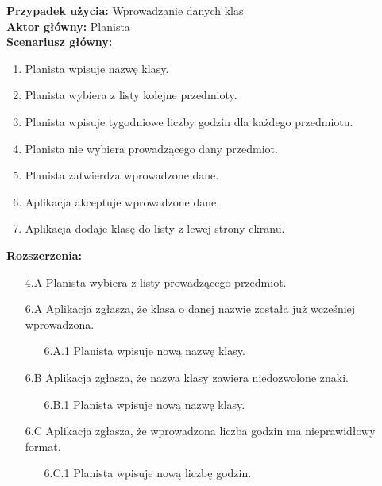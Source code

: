 \noindent
\textbf{Przypadek użycia:} Wprowadzanie danych klas\\
\textbf{Aktor główny:} Planista\\
\textbf{Scenariusz główny:}
\begin{enumerate}
	\item Planista wpisuje nazwę klasy.
	\item Planista wybiera z listy kolejne przedmioty.
	\item Planista wpisuje tygodniowe liczby godzin dla każdego przedmiotu.
	\item Planista nie wybiera prowadzącego dany przedmiot.
	\item Planista zatwierdza wprowadzone dane.
	\item Aplikacja akceptuje wprowadzone dane.
	\item Aplikacja dodaje klasę do listy z lewej strony ekranu.
\end{enumerate}
\textbf{Rozszerzenia:}
	\begin{enumerate}
         \item[4.A] Planista wybiera z listy prowadzącego przedmiot.
         \item[6.A] Aplikacja zgłasza, że klasa o danej nazwie została już wcześniej wprowadzona.
         \begin{enumerate}
         	\item[6.A.1] Planista wpisuje nową nazwę klasy.
         \end{enumerate}
         \item[6.B] Aplikacja zgłasza, że nazwa klasy zawiera niedozwolone znaki.
         \begin{enumerate}
         	\item[6.B.1] Planista wpisuje nową nazwę klasy.
         \end{enumerate}
         \item[6.C] Aplikacja zgłasza, że wprowadzona liczba godzin ma nieprawidłowy format.
         \begin{enumerate}
         	\item[6.C.1] Planista wpisuje nową liczbę godzin.
         \end{enumerate}
	\end{enumerate}
	
